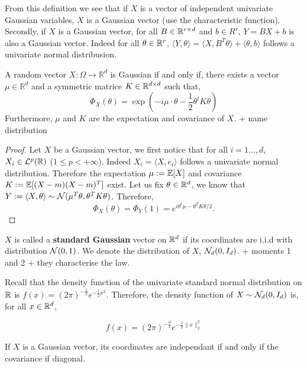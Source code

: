 \documentclass{article}
\begin{document}
From this definition we see that if $X$ is a vector of independent univariate
Gaussian variables, $X$ is a Gaussian vector (use the characteristic function).
Secondly, if $X$ is a Gaussian vector, for all $B \in \mathbb{R}^{r \times d}$ and $b
\in R^r$, $Y = BX + b$ is also a Gaussian vector. Indeed for all $\theta \in
\mathbb{R}^r$, $\langle Y,\theta \rangle = \langle X,B^T\theta \rangle + \langle
\theta,b \rangle$ follows a univariate normal distribusion.

\begin{theorem} A random vector $X: \Omega \rightarrow \mathbb{R}^{d}$ is
  Gaussian if and only if, there exists a vector $\mu \in \mathbb{R}^{d}$ and a
  symmetric matrice $K \in \mathbb{R}^{d \times d}$ such that, 
  $$
  \Phi_{X}(\theta)=\exp \left(-i \mu \cdot \theta-\frac{1}{2} \theta^t K \theta\right)
  $$
  Furthermore, $\mu$ and $K$ are the expectation and covariance of $X$. + name distribution
\end{theorem}

\begin{proof}
  Let $X$ be a Gaussian vector, we first notice that for all $i=1\ldots,d$,
  $X_i \in \mathcal{L}^p(\mathbb{R})$ ($1\leq p < +\infty$). Indeed $X_i = \langle X,e_i
  \rangle$ follows a univariate normal distribution. Therefore the expectation
  $\mu:=\mathbb{E}[X]$ and covariance $K:=\mathbb{E}[(X-m)(X-m)^T]$ exist. 
  Let us fix $\theta \in \mathbb{R}^{d}$, we know that $Y:= \langle X,\theta \rangle \sim
  \mathcal{N}(\mu^T\theta, \theta^TK\theta)$. Therefore, $$\Phi_{X}(\theta) = \Phi_Y(1)
  = e^{i\theta^t\mu - \theta^TK\theta/2}.$$
\end{proof}

\begin{definition}
  $X$ is called a \textbf{standard Gaussian} vector on $\mathbb{R}^{d}$ if its coordinates are i.i.d with distribution
  $\mathcal{N}(0,1)$. We denote the distribution of $X$, $\mathcal{N}_d(0,I_d)$. + moments 1 and
  2 + they characterise the law. 
\end{definition}

Recall that the density function of the univariate standard normal distribution on
$\mathbb{R}$ is $f(x)=(2 \pi)^{-\frac{1}{2}} e^{-\frac{1}{2}x^{2}}$. Therefore, the
density function of $X \sim \mathcal{N}_d(0,I_d)$ is, for all $x \in \mathbb{R}^{d}$,

$$f(x)=(2 \pi)^{-\frac{d}{2}} e^{-\frac{1}{2}\|x\|_2^{2}}$$

\begin{prop}
  If $X$ is a Gaussian vector, its coordinates are independant if and only if
  the covariance if diagonal. 
\end{prop}
\end{document}
